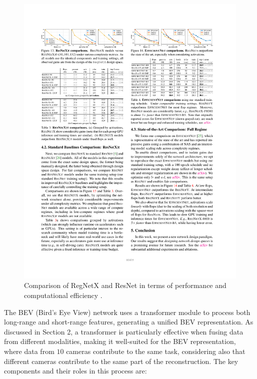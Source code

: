 \begin{figure}[H]
    \centering
    \includegraphics[width=1\linewidth]{Radosavovic_Designing_Network_Design_Spaces_CVPR_2020_paper (2).pdf}
    \caption{Comparison of RegNetX and ResNet in terms of performance and computational efficiency \cite{Radosavovic2020}.}
    \label{fig:regnetvsresnet}
\end{figure}

The BEV (Bird’s Eye View) network uses a transformer module to process both long-range and short-range features, generating a unified BEV representation. As discussed in Section 2, a transformer is particularly effective when fusing data from different modalities, making it well-suited for the BEV representation, where data from $10$ cameras contribute to the same task, considering also that different cameras contribute to the same part of the reconstruction. 
The key components and their roles in this process are:


